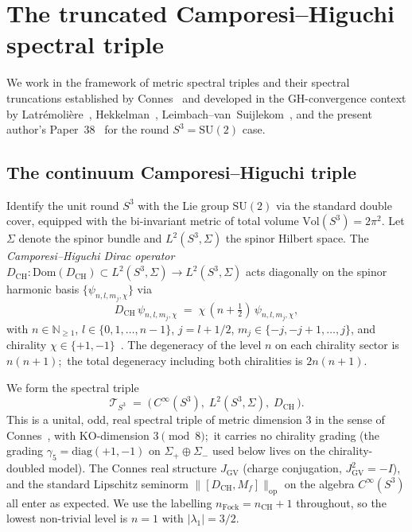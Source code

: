 \documentclass[11pt,a4paper]{article}
\theoremstyle{plain}
\theoremstyle{definition}
\newcommand{\sthree}{S^{3}}
\newcommand{\Tcal}{\mathcal{T}}
\newcommand{\opnorm}[1]{\lVert #1 \rVert_{\mathrm{op}}}
\newcommand{\N}{\mathbb{N}}
\newcommand{\SU}{\mathrm{SU}}
\newcommand{\Vol}{\mathrm{Vol}}
\newcommand{\Mat}{M}
\newcommand{\DCH}{D_{\mathrm{CH}}}
\begin{document}
\section{The truncated Camporesi--Higuchi spectral triple}\label{sec:setup}

We work in the framework of metric spectral triples and their
spectral truncations established by
Connes~\cite{connes1995, connes_vs2021} and developed in the
GH-convergence context by
Latr\'emoli\`ere~\cite{latremoliere2018, latremoliere_metric_st_2017},
Hekkelman~\cite{hekkelman2022},
Leimbach--van~Suijlekom~\cite{leimbach_vs2024}, and the present
author's Paper~38~\cite{paper38} for the round $\sthree = \SU(2)$
case.

\subsection{The continuum Camporesi--Higuchi triple}
\label{sec:ch_triple_recap}

Identify the unit round $\sthree$ with the Lie group $\SU(2)$ via
the standard double cover, equipped with the bi-invariant metric of
total volume $\Vol(\sthree) = 2\pi^2$. Let $\Sigma$ denote the spinor
bundle and $L^2(\sthree, \Sigma)$ the spinor Hilbert space. The
\emph{Camporesi--Higuchi Dirac operator}
$\DCH: \mathrm{Dom}(\DCH) \subset L^2(\sthree, \Sigma) \to L^2(\sthree,
\Sigma)$ acts diagonally on the spinor harmonic basis
$\{\psi_{n, l, m_j, \chi}\}$ via
\begin{equation}\label{eq:CH_spectrum}
   \DCH \, \psi_{n, l, m_j, \chi}
   \;=\; \chi\,(n + \tfrac{1}{2})\, \psi_{n, l, m_j, \chi},
\end{equation}
with $n \in \N_{\ge 1}$, $l \in \{0, 1, \ldots, n-1\}$,
$j = l + 1/2$, $m_j \in \{-j, -j+1, \ldots, j\}$, and chirality
$\chi \in \{+1, -1\}$~\cite{camporesi_higuchi1996}. The degeneracy of
the level $n$ on each chirality sector is $n(n+1)$;\ the total
degeneracy including both chiralities is $2n(n+1)$.

We form the spectral triple
\begin{equation}\label{eq:T_S3}
   \Tcal_{\sthree}
   \;=\; \bigl(\, C^\infty(\sthree),\;
                 L^2(\sthree, \Sigma),\;
                 \DCH \,\bigr).
\end{equation}
This is a unital, odd, real spectral triple of metric dimension $3$
in the sense of Connes~\cite{connes1995}, with KO-dimension $3 \pmod
8$;\ it carries no chirality grading (the grading
$\gamma_5 = \mathrm{diag}(+1, -1)$ on $\Sigma_+ \oplus \Sigma_-$ used
below lives on the chirality-doubled model). The Connes real structure
$J_{\mathrm{GV}}$ (charge conjugation, $J_{\mathrm{GV}}^2 = -I$), and
the standard Lipschitz seminorm
$\opnorm{[\DCH, \Mat_f]}$ on the algebra $C^\infty(\sthree)$ all enter
as expected. We use the labelling $n_{\mathrm{Fock}} = n_{\mathrm{CH}}
+ 1$ throughout, so the lowest non-trivial level is $n = 1$ with
$|\lambda_1| = 3/2$.
\end{document}

